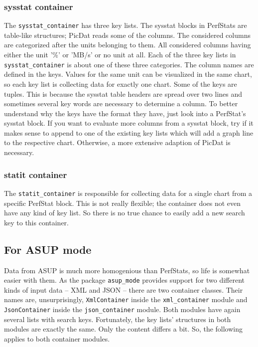 \documentclass[a4paper,11pt]{article}
\begin{document}
\subsubsection*{sysstat container}
The \verb|sysstat_container| has three key lists. The sysstat blocks in PerfStats are table-like structures; PicDat reads some of the columns. The considered columns are categorized after the units belonging to them. All considered columns having either the unit '\%' or 'MB/s' or no unit at all. Each of the three key lists in \verb|sysstat_container| is about one of these three categories. The column names are defined in the keys. Values for the same unit can be visualized in the same chart, so each key list is collecting data for exactly one chart. Some of the keys are tuples. This is because the sysstat table headers are spread over two lines and sometimes several key words are necessary to determine a column. To better understand why the keys have the format they have, just look into a PerfStat's sysstat block. If you want to evaluate more columns from a sysstat block, try if it makes sense to append to one of the existing key lists which will add a graph line to the respective chart. Otherwise, a more extensive adaption of PicDat is necessary.

\subsubsection*{statit container}
The \verb|statit_container| is responsible for collecting data for a single chart from a specific PerfStat block. This is not really flexible; the container does not even have any kind of key list. So there is no true chance to easily add a new search key to this container.

\subsection*{For ASUP mode}
Data from ASUP is much more homogenious than PerfStats, so life is somewhat easier with them. As the package \verb|asup_mode| provides support for two different kinds of input data -- XML and JSON -- there are two container classes. Their names are, unsurprisingly, \verb|XmlContainer| inside the \verb|xml_container| module and \verb|JsonContainer| inside the \verb|json_container| module. Both modules have again several lists with search keys. Fortunately, the key lists' structures in both modules are exactly the same. Only the content differs a bit. So, the following applies to both container modules.
\end{document}
